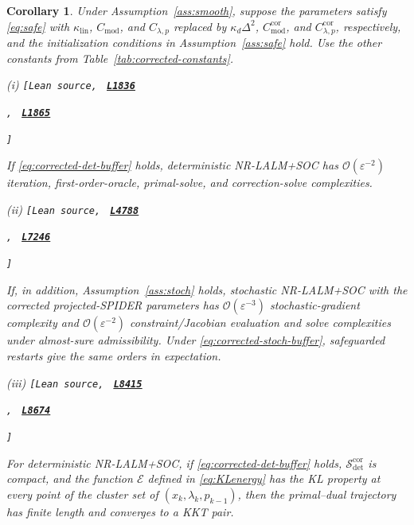 \documentclass[11pt]{article}
\newtheorem{corollary}[theorem]{Corollary}
\theoremstyle{definition}
\theoremstyle{remark}
\numberwithin{equation}{section}
\numberwithin{figure}{section}
\numberwithin{table}{section}
\numberwithin{algorithm}{section}
\newcommand{\leanLinkText}[1]{%
  \underline{\textbf{#1}}%
}
\newcommand{\leanDeclTag}[2]{%
  {\footnotesize\texttt{[Lean source, }}%
  \href{https://github.com/optpku/ReasBook/blob/v4.32.2/ReasBook/Papers/TR_LALM_theory/#1?plain=1\#L#2}%
    {\leanLinkText{\footnotesize\texttt{L#2}}}%
}
\newcommand{\leanDeclTagExtra}[2]{%
  \unskip
  {\footnotesize\texttt{, }}%
  \href{https://github.com/optpku/ReasBook/blob/v4.32.2/ReasBook/Papers/TR_LALM_theory/#1?plain=1\#L#2}%
    {\leanLinkText{\footnotesize\texttt{L#2}}}\allowbreak
}
\newcommand{\leanDeclTagEnd}{%
  \unskip
  {\footnotesize\texttt{]}}\enspace
}
\begin{document}
\begin{corollary}
\label{cor:corrected-transfer}
Under Assumption~\ref{ass:smooth}, suppose the parameters satisfy
\eqref{eq:safe} with  $\kappa_{\mathrm{lin}}$, $C_{\mathrm{mod}}$, and $C_{\lambda,p}$ replaced by $\kappa_d\Delta^2$, $C_{\mathrm{mod}}^{\mathrm{cor}}$, and
$C_{\lambda,p}^{\mathrm{cor}}$, respectively, and the initialization
conditions in Assumption~\ref{ass:safe} hold.  Use the other constants from
Table~\ref{tab:corrected-constants}.

\medskip
\noindent\textup{(i)}
\leanDeclTag{Corollary_4_2.lean}{1836}
\leanDeclTagExtra{Corollary_4_2.lean}{1865}
\leanDeclTagEnd
If
\eqref{eq:corrected-det-buffer} holds, deterministic NR-LALM+SOC has
\(\mathcal O(\varepsilon^{-2})\) iteration, first-order-oracle, primal-solve,
and correction-solve complexities.

\medskip
\noindent\textup{(ii)}
\leanDeclTag{Corollary_4_2.lean}{4788}
\leanDeclTagExtra{Corollary_4_2.lean}{7246}
\leanDeclTagEnd
If, in addition,
Assumption~\ref{ass:stoch} holds, stochastic NR-LALM+SOC with the corrected projected-SPIDER parameters has \(\mathcal O(\varepsilon^{-3})\) stochastic-gradient complexity and \(\mathcal O(\varepsilon^{-2})\) constraint/Jacobian evaluation and solve complexities under almost-sure admissibility.  Under \eqref{eq:corrected-stoch-buffer}, safeguarded restarts
give the same orders in expectation.

\medskip
\noindent\textup{(iii)}
\leanDeclTag{Corollary_4_2.lean}{8415}
\leanDeclTagExtra{Corollary_4_2.lean}{8674}
\leanDeclTagEnd
For deterministic NR-LALM+SOC, if \eqref{eq:corrected-det-buffer} holds, \(\mathcal S_{\mathrm{det}}^{\mathrm{cor}}\) is compact, and the function \(\mathcal E\) defined in \eqref{eq:KLenergy} has the KL property at every point of the cluster set of \((x_k,\lambda_k,p_{k-1})\), then the primal--dual
trajectory has finite length and converges to a KKT pair.
\end{corollary}
\end{document}
